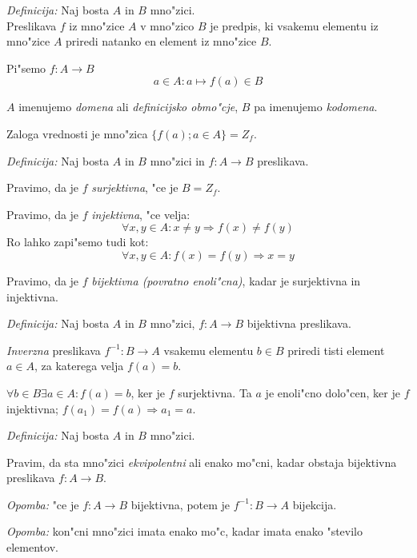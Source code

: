 \emph{Definicija:} Naj bosta $A$ in $B$ mno"zici.\\
Preslikava $f$ iz mno"zice $A$ v mno"zico $B$ je predpis, ki vsakemu elementu iz mno"zice $A$ priredi natanko en element iz mno"zice $B$.

Pi"semo $f: A \rightarrow B$\\
\begin{equation*}
a \in A: a \mapsto f(a) \in B
\end{equation*}

$A$ imenujemo \emph{domena} ali \emph{definicijsko obmo"cje}, $B$ pa imenujemo \emph{kodomena}.

Zaloga vrednosti je mno"zica $\{f(a); a \in A\} = Z_f$.

\emph{Definicija:} Naj bosta $A$ in $B$ mno"zici in $f: A \rightarrow B$ preslikava.

Pravimo, da je $f$ \emph{surjektivna}, "ce je $B = Z_f$.

Pravimo, da je $f$ \emph{injektivna}, "ce velja:
\begin{equation*}
\forall x, y \in A: x \neq y \Rightarrow f(x) \neq f(y)
\end{equation*}
Ro lahko zapi"semo tudi kot:
\begin{equation*}
\forall x, y \in A: f(x) = f(y) \Rightarrow x = y
\end{equation*}

Pravimo, da je $f$ \emph{bijektivna (povratno enoli"cna)}, kadar je surjektivna in injektivna.

\emph{Definicija:} Naj bosta $A$ in $B$ mno"zici, $f: A \rightarrow B$ bijektivna preslikava.

\emph{Inverzna} preslikava $f^{-1}: B \rightarrow A$ vsakemu elementu $b \in B$ priredi tisti element $a \in A$, za katerega velja $f(a) = b$.


$\forall b \in B \exists a \in A: f(a) = b$, ker je $f$ surjektivna. Ta $a$ je enoli"cno dolo"cen, ker je $f$ injektivna; $f(a_1) = f(a) \Rightarrow a_1 = a$.

\emph{Definicija:} Naj bosta $A$ in $B$ mno"zici.

Pravim, da sta mno"zici \emph{ekvipolentni} ali enako mo"cni, kadar obstaja bijektivna preslikava $f: A \rightarrow B$.

\emph{Opomba:} "ce je $f: A \rightarrow B$ bijektivna, potem je $f^{-1}: B \rightarrow A$ bijekcija.

\emph{Opomba:} kon"cni mno"zici imata enako mo"c, kadar imata enako "stevilo elementov.

